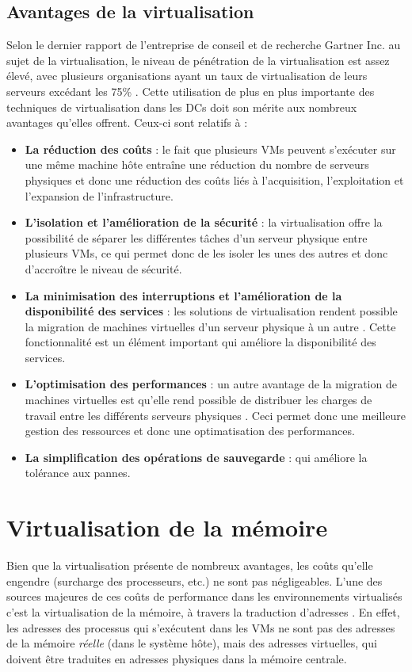 \subsection{Avantages de la virtualisation}
Selon le dernier rapport de l’entreprise de conseil et de recherche Gartner Inc. au sujet de la virtualisation, le niveau de pénétration de la virtualisation est assez élevé, avec plusieurs organisations ayant un taux de virtualisation de leurs serveurs excédant les 75\% \cite{online3}. Cette utilisation de plus en plus importante des techniques de virtualisation dans les DCs doit son mérite aux nombreux avantages qu'elles offrent. Ceux-ci sont relatifs à :

\begin{itemize}[label=, font=\large \color{darkorange}]
    \item \textbf{La réduction des coûts} : le fait que plusieurs VMs peuvent s'exécuter sur une même machine hôte entraîne une réduction du nombre de serveurs physiques et donc une réduction des coûts liés à l'acquisition, l'exploitation et l'expansion de l'infrastructure. 
    \item \textbf{L'isolation et l'amélioration de la sécurité} : la virtualisation offre la possibilité de séparer les différentes tâches d'un serveur physique entre plusieurs VMs, ce qui permet donc de les isoler les unes des autres et donc d'accroître le niveau de sécurité.
    \item \textbf{La minimisation des interruptions et l'amélioration de la disponibilité des services} : les solutions de virtualisation rendent possible la migration de machines virtuelles d'un serveur physique à un autre \cite{article3, article4}. Cette fonctionnalité est un élément important qui améliore la disponibilité des services.
    \item \textbf{L'optimisation des performances} : un autre avantage de la migration de machines virtuelles est qu'elle rend possible de distribuer les charges de travail entre les différents serveurs physiques \cite{article3, article4}. Ceci permet donc une meilleure gestion des ressources et donc une optimatisation des performances.
    \item \textbf{La simplification des opérations de sauvegarde} : qui améliore la tolérance aux pannes.
\end{itemize}

\section{Virtualisation de la mémoire}
Bien que la virtualisation présente de nombreux avantages, les coûts qu'elle engendre (surcharge des processeurs, etc.) ne sont pas négligeables. L'une des sources majeures de ces coûts de performance dans les environnements virtualisés c'est la virtualisation de la mémoire, à travers la traduction d'adresses \cite{article6, article8}. En effet, les adresses des processus qui s'exécutent dans les VMs ne sont pas des adresses de la mémoire \textit{réelle} (dans le système hôte), mais des adresses virtuelles, qui doivent être traduites en adresses physiques dans la mémoire centrale. 

